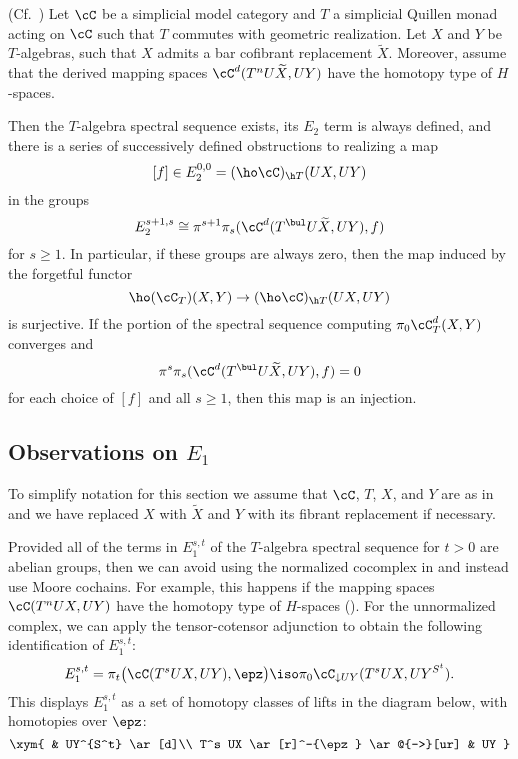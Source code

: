 \documentclass[leqno,oneside,english]{elsarticle}
\begin{document}
\begin{thm}{(Cf.~\cite[Cor.~2.4.15]{GoH05})}\label{thm:obstructions}
  Let $\cC$ be a simplicial model category and $T$ a simplicial
  Quillen monad acting on $\cC$ such that $T$ commutes with geometric realization. Let $X$ and $Y$ be $T$-algebras, such that $X$ admits a bar cofibrant replacement $\widetilde{X}$. Moreover, assume that the derived mapping spaces
  $\cC^d(T^{n}U\widetilde{X}, UY)$ have the homotopy type of
  $H$-spaces.

  Then the $T$-algebra spectral sequence
  exists, its $E_2$ term is always defined, and there is a series of
  successively defined obstructions to realizing a map 
  \[ [f]\in E_2^{0,0} = (\ho\cC)_{\h T}(UX, UY) \] 
  in the groups 
  \[ E_{2}^{s+1,s}\cong \pi^{s+1}\pi_s (\cC^d(T^{\bul}U\widetilde{X},
  UY),f) \] 
  for $s\geq 1$.  In particular, if these groups are always zero, then the
  map induced by the forgetful functor 
  \[ \ho(\cC_T)(X,Y)\rightarrow (\ho\cC)_{\h T}(UX,UY) \]
   is surjective. If the portion of the spectral sequence computing $\pi_0
  \cC_T^d(X,Y)$ converges and
   \[ \pi^s \pi_s(\cC^d(T^{\bul}U\widetilde{X}, UY),f)=0\]  
  for each choice of $[f]$ and all $s \ge 1$, then this map is an injection.
\end{thm}

\subsection{Observations on \texorpdfstring{$E_1$}{E\_1}}
\label{sec:observations-e1}
To simplify notation for this section we assume that $\cC$, $T$, $X$,
and $Y$ are as in  and we have replaced $X$ with
$\widetilde{X}$ and $Y$ with its fibrant replacement if necessary.
{{\ifshowsaveblocks
{}
\fi}}{}

Provided all of the terms in $E_1^{s,t}$ of the $T$-algebra spectral
sequence for $t>0$ are abelian groups, then we can avoid using the normalized cocomplex in \cite{Bou89} and instead use Moore cochains. For example,
this happens if the mapping spaces $\cC(T^nUX,UY)$ have
the homotopy type of $H$-spaces (). For the unnormalized complex, we can apply the tensor-cotensor adjunction to obtain the following identification of $E_1^{s,t}$:
\[
E_1^{s,t} = \pi_t \big( \cC(T^s UX, UY), \epz\big) \iso
\pi_0 \cC_{\downarrow UY}(T^s UX, UY^{S^t}).
\]
This displays $E_1^{s,t}$ as a set of homotopy classes of lifts in
the diagram below, with homotopies over $\epz$:
\[
\xym{
  & UY^{S^t} \ar[d]\\
  T^s UX \ar[r]^-{\epz} \ar@{-->}[ur] & UY }
\]
\end{document}
